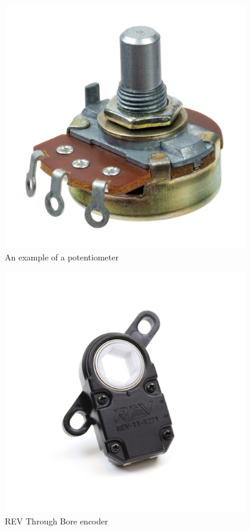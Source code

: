\begin{figure}[htp]
\centering
\includegraphics[width=0.95\textwidth, angle=0]{Meetings/February/02-17-22/02-17-22 1.jpg}
\caption{An example of a potentiometer}
\label{fig:021722_1}
\end{figure}

\begin{figure}[htp]
\centering
\includegraphics[width=0.95\textwidth, angle=0]{Meetings/February/02-17-22/02-17-22 2.PNG}
\caption{REV Through Bore encoder}
\label{fig:021722_2}
\end{figure}

